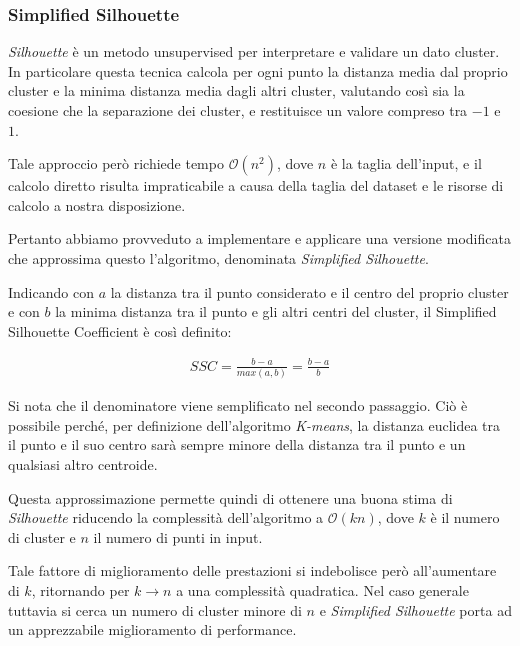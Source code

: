 \documentclass[
	11pt, %
	a4paper, %
	oneside, %
	headinclude,footinclude, %
	BCOR5mm, %
]{scrartcl}
\begin{document}
		\subsubsection{Simplified Silhouette}
			\emph{Silhouette} è un metodo unsupervised per interpretare e validare un dato cluster.
			In particolare questa tecnica calcola per ogni punto la distanza media dal proprio cluster e la minima distanza media dagli altri cluster, valutando così sia la coesione che la separazione dei cluster, e restituisce un valore compreso tra $-1$ e $1$.
			
			Tale approccio però richiede tempo $\mathcal{O}(n^2)$, dove $n$ è la taglia dell'input, e il calcolo diretto risulta impraticabile a causa della taglia del dataset e le risorse di calcolo a nostra disposizione.

			Pertanto abbiamo provveduto a implementare e applicare una versione modificata che approssima questo l'algoritmo, denominata \emph{Simplified Silhouette}\cite{sscmapreduce}.
			
			Indicando con $a$ la distanza tra il punto considerato e il centro del proprio cluster e con $b$ la minima distanza tra il punto e gli altri centri del cluster, il {Simplified Silhouette Coefficient} è così definito:

			\begin{equation} \begin{aligned} \label{eq:simplifiedSilhouette}
				SSC = \frac{b - a}{ max(a, b) } = \frac{b - a}{b}
			\end{aligned} \end{equation}

			Si nota che il denominatore viene semplificato nel secondo passaggio.
			Ciò è possibile perché, per definizione dell'algoritmo \emph{K-means}, la distanza euclidea tra il punto e il suo centro sarà sempre minore della distanza tra il punto e un qualsiasi altro centroide.
			

			Questa approssimazione permette quindi di ottenere una buona stima di \emph{Silhouette}\cite{ssc} riducendo la complessità dell'algoritmo a $\mathcal{O}(kn)$, dove $k$ è il numero di cluster e $n$ il numero di punti in input.
			
			Tale fattore di miglioramento delle prestazioni si indebolisce però all'aumentare di $k$, ritornando per $k \to n$ a una complessità quadratica. 
			Nel caso generale tuttavia si cerca un numero di cluster minore di $n$ e \emph{Simplified Silhouette} porta ad un apprezzabile miglioramento di performance.
\end{document}
